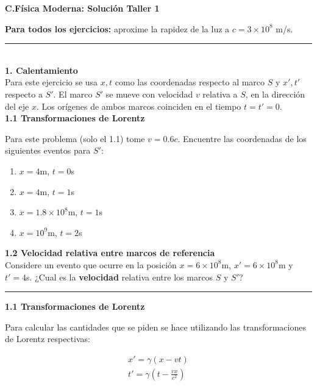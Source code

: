 \documentclass[12pt]{article}
\begin{document}
 
 \color{ForestGreen}
\begin{center}
\Large \textbf{C.Física Moderna: Solución Taller 1}
\end{center}
 

 \textbf{Para todos los ejercicios:} aproxime la rapidez de la luz a $c=3\times 10^8$ m/s.\\ 
\noindent\rule{16.5cm}{0.4pt}\\ 
 \textbf{1. Calentamiento}\\
 
  Para este ejercicio se usa $x,t$ como las coordenadas respecto al marco $S$ y $x',t'$ respecto a $S'$. El marco $S'$ se mueve con velocidad $v$ relativa a $S$, en la dirección del eje $x$. Los orígenes de ambos marcos coinciden en el tiempo $t = t' = 0$.\\
 
 \textbf{1.1 Transformaciones de Lorentz}
 
 Para este problema (solo el 1.1) tome $v = 0.6c$. Encuentre las coordenadas de los siguientes eventos para $S'$:
 
 \begin{enumerate}
 	\item $x=4$m, $t = 0$s\\
 	\item $x=4$m, $t = 1$s\\
 	\item $x=1.8\times 10^8$m, $t = 1$s\\
 	\item $x=10^9$m, $t = 2$s\\
 \end{enumerate} 
 
 

\textbf{1.2 Velocidad relativa entre marcos de referencia}\\

Considere un evento que ocurre en la posición $x=6\times 10^8$m, $x'=6\times 10^8$m  y $t'=4$s. ¿Cual es la \textbf{velocidad} relativa entre los marcos $S$ y $S'$? 


\noindent\rule{16.5cm}{0.4pt}


 \color{Black}
 
 \textbf{1.1 Transformaciones de Lorentz}
 
 Para calcular las cantidades que se piden se hace utilizando las transformaciones de Lorentz respectivas:
 
 \begin{align}
 x' = \gamma (x-vt)\\
 t' = \gamma \left(t- \frac{vx}{c^2}\right)
 \end{align}
 
\end{document}
